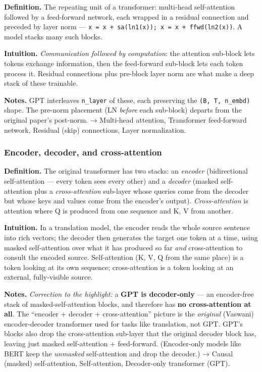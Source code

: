 \documentclass[
  10pt,
  letterpaper,
  onecolumn]{article}
\begin{document}
\textbf{Definition.} The repeating unit of a transformer: multi-head
self-attention followed by a feed-forward network, each wrapped in a
residual connection and preceded by layer norm ---
\texttt{x\ =\ x\ +\ sa(ln1(x));\ x\ =\ x\ +\ ffwd(ln2(x))}. A model
stacks many such blocks.

\textbf{Intuition.} \emph{Communication followed by computation}: the
attention sub-block lets tokens exchange information, then the
feed-forward sub-block lets each token process it. Residual connections
plus pre-block layer norm are what make a deep stack of these trainable.

\textbf{Notes.} GPT interleaves \texttt{n\_layer} of these, each
preserving the \texttt{(B,\ T,\ n\_embd)} shape. The pre-norm placement
(LN \emph{before} each sub-block) departs from the original paper's
post-norm. → Multi-head attention, Transformer feed-forward network,
Residual (skip) connections, Layer normalization.

\hypertarget{encoder-decoder-and-cross-attention}{%
\subsubsection{Encoder, decoder, and
cross-attention}\label{encoder-decoder-and-cross-attention}}

\textbf{Definition.} The original transformer has two stacks: an
\emph{encoder} (bidirectional self-attention --- every token sees every
other) and a \emph{decoder} (masked self-attention plus a
\emph{cross-attention} sub-layer whose queries come from the decoder but
whose keys and values come from the encoder's output).
\emph{Cross-attention} is attention where Q is produced from one
sequence and K, V from another.

\textbf{Intuition.} In a translation model, the encoder reads the whole
source sentence into rich vectors; the decoder then generates the target
one token at a time, using masked self-attention over what it has
produced so far \emph{and} cross-attention to consult the encoded
source. Self-attention (K, V, Q from the same place) is a token looking
at its own sequence; cross-attention is a token looking at an external,
fully-visible source.

\textbf{Notes.} \emph{Correction to the highlight:} a \textbf{GPT is
decoder-only} --- an encoder-free stack of masked-self-attention blocks,
and therefore has \textbf{no cross-attention at all}. The ``encoder +
decoder + cross-attention'' picture is the \emph{original} (Vaswani)
encoder-decoder transformer used for tasks like translation, not GPT.
GPT's blocks also drop the cross-attention sub-layer that the original
decoder block has, leaving just masked self-attention + feed-forward.
(Encoder-only models like BERT keep the \emph{unmasked} self-attention
and drop the decoder.) → Causal (masked) self-attention, Self-attention,
Decoder-only transformer (GPT).
\end{document}
